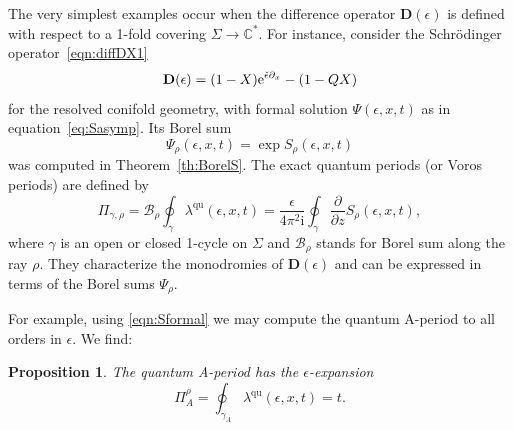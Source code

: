 \documentclass[pdftex]{sigma}
\numberwithin{equation}{section}
\newtheorem{Proposition}[Theorem]{Proposition}
 { \theoremstyle{definition}
\newtheorem{Definition}[Theorem]{Definition}
\newtheorem{Note}[Theorem]{Note}
\newtheorem{Example}[Theorem]{Example}
\newtheorem{Remark}[Theorem]{Remark} }
\begin{document}
The very simplest examples occur when the difference operator $\mathbf{D}(\epsilon)$ is defined with respect to a 1-fold covering $\Sigma \to \mathbb{C}^*$. For instance, consider the Schr\"odinger operator~\eqref{eqn:diffDX1}
\begin{equation*}
 \mathbf{D} (\epsilon) = (1-X) {\rm e}^{\check{\epsilon} \partial_x} - (1 - Q X)
\end{equation*}
 for the resolved conifold geometry, with formal solution
$\Psi(\epsilon,x,t)$ as in equation~\eqref{eq:Sasymp}. Its Borel sum
\begin{equation*}
\Psi_\rho(\epsilon,x,t) = \exp S_\rho(\epsilon,x,t)
\end{equation*}
was computed in Theorem~\ref{th:BorelS}. The exact quantum periods (or Voros periods) are defined by
 \begin{equation*}
 \Pi_{\gamma,\rho} = \mathcal{B}_\rho \oint_\gamma \lambda^{\mathrm{qu}}(\epsilon,x,t) = \frac{\epsilon}{4 \pi^2 \mathrm{i}} \oint_\gamma \frac{\partial}{\partial z} S_\rho(\epsilon,x,t),
 \end{equation*}
where $\gamma$ is an open or closed 1-cycle on $\Sigma$ and $\mathcal{B}_\rho$ stands for Borel sum along the ray $\rho$. They characterize the monodromies of $\mathbf{D} (\epsilon)$ and can be expressed in terms of the Borel sums $\Psi_\rho$.

For example, using \eqref{eqn:Sformal} we may compute the quantum A-period to all orders in $\epsilon$. We find:

\begin{Proposition}\label{prop:A-period}
The quantum A-period has the $\epsilon$-expansion
\begin{equation*}
 \Pi^\rho_A = \oint_{\gamma_A} \lambda^{\mathrm{qu}}(\epsilon,x,t) = t.
\end{equation*}
\end{Proposition}
\end{document}
